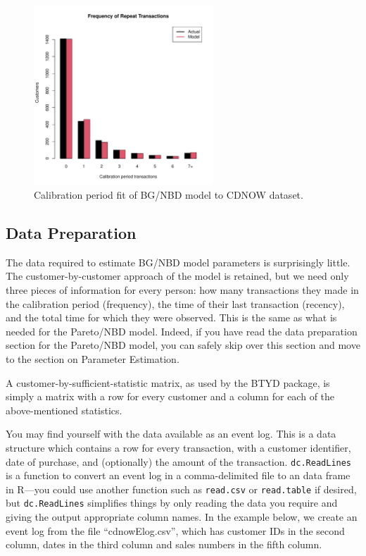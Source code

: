 \documentclass[10pt, letterpaper, onecolumn, oneside, final]{article}\usepackage[]{graphicx}\usepackage[]{color}
\begin{document}
\begin{figure}
  \begin{center}
  \includegraphics[width=0.6\textwidth]{figure/bgnbdCalibrationFit}
  \caption{Calibration period fit of BG/NBD model to CDNOW dataset.}\label{fig:bgnbdCalibrationFit}
  \end{center}
\end{figure}



\subsection{Data Preparation}

The data required to estimate BG/NBD model parameters is
surprisingly little. The customer-by-customer approach of the model is
retained, but we need only three pieces of information for every
person: how many transactions they made in the calibration period
(frequency), the time of their last transaction (recency), and the
total time for which they were observed. This is the same as what is 
needed for the Pareto/NBD model. Indeed, if you have read the data 
preparation section for the Pareto/NBD model, you can safely skip over
this section and move to the section on Parameter Estimation.  

A customer-by-sufficient-statistic matrix, as used by the BTYD package,
is simply a matrix with a row for every customer and a column for each
of the above-mentioned statistics.

You may find yourself with the data available as an event log. This is
a data structure which contains a row for every transaction, with a
customer identifier, date of purchase, and (optionally) the amount of
the transaction. \texttt{dc.ReadLines} is a function to convert an
event log in a comma-delimited file to an data frame in R---you could
use another function such as \texttt{read.csv} or \texttt{read.table}
if desired, but \texttt{dc.ReadLines} simplifies things by only
reading the data you require and giving the output appropriate column
names. In the example below, we create an event log from the file
``cdnowElog.csv'', which has customer IDs in the second column, dates
in the third column and sales numbers in the fifth column.
\end{document}
